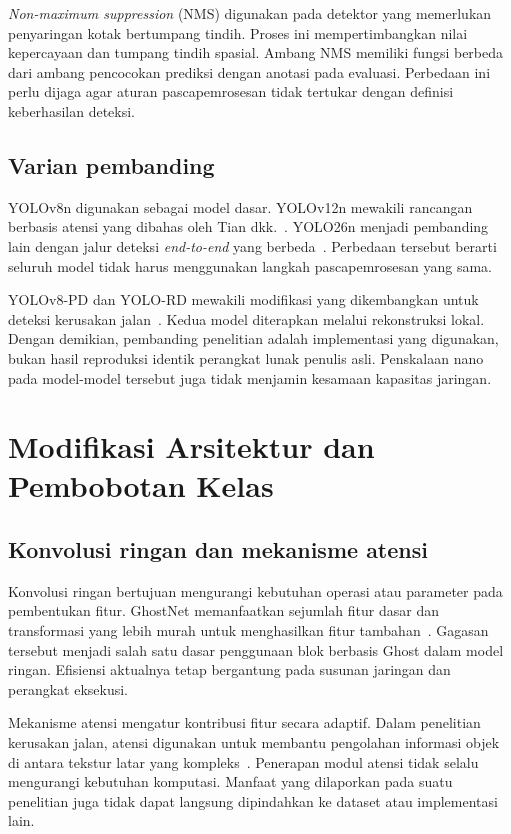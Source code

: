 \textit{Non-maximum suppression} (NMS) digunakan pada detektor yang memerlukan penyaringan kotak bertumpang tindih. Proses ini mempertimbangkan nilai kepercayaan dan tumpang tindih spasial. Ambang NMS memiliki fungsi berbeda dari ambang pencocokan prediksi dengan anotasi pada evaluasi. Perbedaan ini perlu dijaga agar aturan pascapemrosesan tidak tertukar dengan definisi keberhasilan deteksi.

\subsection{Varian pembanding}
YOLOv8n digunakan sebagai model dasar. YOLOv12n mewakili rancangan berbasis atensi yang dibahas oleh Tian dkk.~\cite{tian2025yolov12_primary}. YOLO26n menjadi pembanding lain dengan jalur deteksi \textit{end-to-end} yang berbeda~\cite{sapkota2025yolo26_primary}. Perbedaan tersebut berarti seluruh model tidak harus menggunakan langkah pascapemrosesan yang sama.

YOLOv8-PD dan YOLO-RD mewakili modifikasi yang dikembangkan untuk deteksi kerusakan jalan~\cite{Zeng2024,Wang2025}. Kedua model diterapkan melalui rekonstruksi lokal. Dengan demikian, pembanding penelitian adalah implementasi yang digunakan, bukan hasil reproduksi identik perangkat lunak penulis asli. Penskalaan nano pada model-model tersebut juga tidak menjamin kesamaan kapasitas jaringan.

\section{Modifikasi Arsitektur dan Pembobotan Kelas}
\subsection{Konvolusi ringan dan mekanisme atensi}
Konvolusi ringan bertujuan mengurangi kebutuhan operasi atau parameter pada pembentukan fitur. GhostNet memanfaatkan sejumlah fitur dasar dan transformasi yang lebih murah untuk menghasilkan fitur tambahan~\cite{han2020ghostnet}. Gagasan tersebut menjadi salah satu dasar penggunaan blok berbasis Ghost dalam model ringan. Efisiensi aktualnya tetap bergantung pada susunan jaringan dan perangkat eksekusi.

Mekanisme atensi mengatur kontribusi fitur secara adaptif. Dalam penelitian kerusakan jalan, atensi digunakan untuk membantu pengolahan informasi objek di antara tekstur latar yang kompleks~\cite{Li2024,Zeng2024}. Penerapan modul atensi tidak selalu mengurangi kebutuhan komputasi. Manfaat yang dilaporkan pada suatu penelitian juga tidak dapat langsung dipindahkan ke dataset atau implementasi lain.

